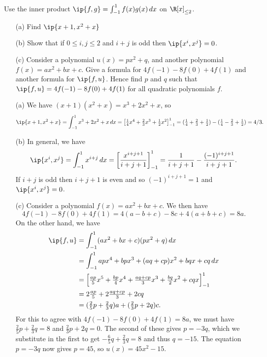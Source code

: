 \begin{exercise}
 Use the inner product $\ip{f,g}=\int_{-1}^1 f(x)g(x)\,dx$ on
 $\R[x]_{\leq 2}$.
 \begin{itemize}
  \item[(a)] Find $\ip{x+1,x^2+x}$
  \item[(b)] Show that if $0\leq i,j\leq 2$ and $i+j$ is odd then
   $\ip{x^i,x^j}=0$.
  \item[(c)] Consider a polynomial $u(x)=px^2+q$, and another
   polynomial $f(x)=ax^2+bx+c$.  Give a formula for
   $4f(-1)-8f(0)+4f(1)$ and another formula for $\ip{f,u}$.  Hence
   find $p$ and $q$ such that $\ip{f,u}=4f(-1)-8f(0)+4f(1)$ for all
   quadratic polynomials $f$.
 \end{itemize}
\end{exercise}
\begin{solution}
 \begin{itemize}
  \item[(a)] We have $(x+1)(x^2+x)=x^3+2x^2+x$, so 
   \[ \ip{x+1,x^2+x}=\int_{-1}^1 x^3+2x^2+x\,dx = 
       \left[ \tfrac{1}{4}x^4 + \tfrac{2}{3}x^3 +
        \tfrac{1}{2}x^2 \right]_{-1}^1 = 
       (\tfrac{1}{4}+\tfrac{2}{3}+\tfrac{1}{2}) - 
       (\tfrac{1}{4}-\tfrac{2}{3}+\tfrac{1}{2}) = 4/3.
   \]
  \item[(b)] In general, we have 
   \[ \ip{x^i,x^j} = \int_{-1}^1 x^{i+j}\,dx = 
       \left[ \frac{x^{i+j+1}}{i+j+1} \right]_{-1}^1 = 
        \frac{1}{i+j+1} - \frac{(-1)^{i+j+1}}{i+j+1}.
   \]
   If $i+j$ is odd then $i+j+1$ is even and so $(-1)^{i+j+1}=1$ and
   $\ip{x^i,x^j}=0$.
  \item[(c)] Consider a polynomial $f(x)=ax^2+bx+c$.  We then have 
   \[ 4f(-1)-8f(0)+4f(1) = 4 (a-b+c) -8c + 4(a+b+c) = 8a. \]
   On the other hand, we have
   \begin{align*}
    \ip{f,u} &= \int_{-1}^1 (ax^2+bx+c)(px^2+q)\,dx \\
     &= \int_{-1}^1 apx^4 + bpx^3+ (aq+cp)x^2 + bqx + cq \, dx \\
     &= \left[ \tfrac{ap}{5} x^5 + \tfrac{bp}{4} x^4 + 
         \tfrac{aq+cp}{3} x^3 + \tfrac{bq}{2} x^2 + cqx \right]_{-1}^1 \\
     &= 2\tfrac{ap}{5} + 2\tfrac{aq+cp}{3} + 2cq \\
     &= (\tfrac{2}{5}p+\tfrac{2}{3}q)a + 
        (\tfrac{2}{3}p+2q)c. 
   \end{align*}
   For this to agree with $4f(-1)-8f(0)+4f(1)=8a$, we must have
   $\tfrac{2}{5}p+\tfrac{2}{3}q=8$ and $\tfrac{2}{3}p+2q=0$.  The
   second of these gives $p=-3q$, which we substitute in the first to
   get $-\tfrac{6}{5}q+\tfrac{2}{3}q=8$ and thus $q=-15$.  The
   equation $p=-3q$ now gives $p=45$, so $u(x)=45x^2-15$.
 \end{itemize}
\end{solution}


